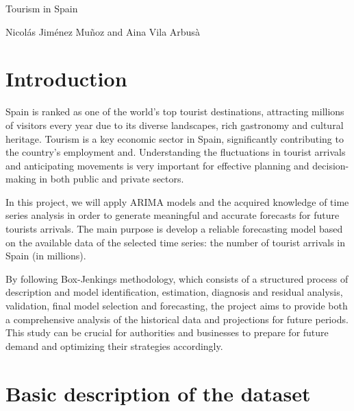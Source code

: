 \documentclass[
]{article}
\author{}
\date{\vspace{-2.5em}}
\begin{document}
\begin{titlepage}
\centering
\vspace*{5cm}
{\Huge Tourism in Spain \par}
\vspace{2cm}
{\Large Nicolás Jiménez Muñoz and Aina Vila Arbusà \par}
\vfill
\end{titlepage}
\newpage

\tableofcontents

\newpage

\hypertarget{introduction}{%
\section{Introduction}\label{introduction}}

Spain is ranked as one of the world's top tourist destinations,
attracting millions of visitors every year due to its diverse
landscapes, rich gastronomy and cultural heritage. Tourism is a key
economic sector in Spain, significantly contributing to the country's
employment and. Understanding the fluctuations in tourist arrivals and
anticipating movements is very important for effective planning and
decision-making in both public and private sectors.

In this project, we will apply ARIMA models and the acquired knowledge
of time series analysis in order to generate meaningful and accurate
forecasts for future tourists arrivals. The main purpose is develop a
reliable forecasting model based on the available data of the selected
time series: the number of tourist arrivals in Spain (in millions).

By following Box-Jenkings methodology, which consists of a structured
process of description and model identification, estimation, diagnosis
and residual analysis, validation, final model selection and
forecasting, the project aims to provide both a comprehensive analysis
of the historical data and projections for future periods. This study
can be crucial for authorities and businesses to prepare for future
demand and optimizing their strategies accordingly.

\newpage

\hypertarget{basic-description-of-the-dataset}{%
\section{Basic description of the
dataset}\label{basic-description-of-the-dataset}}
\end{document}
